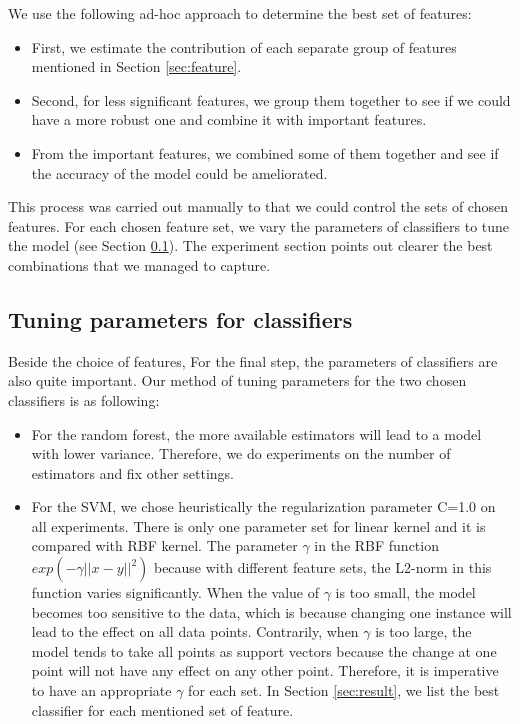 \documentclass{article}
\begin{document}
We use the following ad-hoc approach to determine the best set of features:
\begin{itemize}
\item First, we estimate the contribution of each separate group of features mentioned in Section \ref{sec:feature}.
\item Second, for less significant features, we group them together to see if we could have a more robust one and combine it with important features.
\item From the important features, we combined some of them together and see if the accuracy of the model could be ameliorated.
\end{itemize}
This process was carried out manually to that we could control the sets of chosen features. For each chosen feature set, we vary the parameters of classifiers to tune the model (see Section \ref{sec:tuning}). The experiment section points out clearer the best combinations that we managed to capture.

\subsection{Tuning parameters for classifiers}
\label{sec:tuning}
Beside the choice of features, For the final step, the parameters of classifiers are also quite important. Our method of tuning parameters for the two chosen classifiers is as following:
\begin{itemize}
\item For the random forest, the more available estimators will lead to a model with lower variance. Therefore, we do experiments on the number of estimators and fix other settings.
\item For the SVM, we chose heuristically the regularization parameter C=1.0 on all experiments. There is only one parameter set for linear kernel and it is compared with RBF kernel. The parameter $\gamma$ in the RBF function $exp(-\gamma||x-y||^2)$ because with different feature sets, the L2-norm in this function varies significantly. When the value of $\gamma$ is too small, the model becomes too sensitive to the data, which is because changing one instance will lead to the effect on all data points. Contrarily, when $\gamma$ is too large, the model tends to take all points as support vectors because the change at one point will not have any effect on any other point. Therefore, it is imperative to have an appropriate $\gamma$ for each set. In Section \ref{sec:result}, we list the best classifier for each mentioned set of feature.
\end{itemize}
\end{document}
